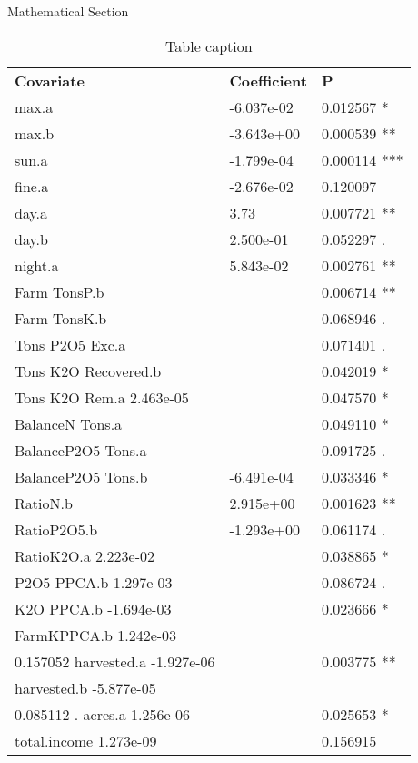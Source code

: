 \documentclass[final]{beamer}
\newlength{\onecolwid}
\newlength{\twocolwid}
\begin{document}
\begin{frame}[t]
\begin{columns}[t]
\begin{column}{\twocolwid}
\begin{columns}[t,totalwidth=\twocolwid]
\begin{column}{\onecolwid}
\begin{block}{Mathematical Section}
   \begin{table}
   \vspace{2ex}
   \begin{tabular}{l l l}
   \textbf{Covariate} & \textbf{Coefficient} & \textbf{P}\\
   max.a &  -6.037e-02    & 0.012567 *    \\
   max.b  & -3.643e+00   & 0.000539 **    \\
   sun.a  &  -1.799e-04  &     0.000114 *** \\
   fine.a   & -2.676e-02  & 0.120097    \\
   day.a  &  3.73 & 0.007721 ** \\
   day.b   & 2.500e-01  & 0.052297 . \\
   night.a   &  5.843e-02 & 0.002761 ** \\
   Farm TonsP.b &   &  0.006714 ** \\
   Farm TonsK.b    &   & 0.068946 . \\
   Tons P2O5 Exc.a  &   &  0.071401 .  \\
   Tons K2O Recovered.b &   &  0.042019 * \\
   Tons K2O Rem.a 2.463e-05 &   & 0.047570 * \\
   BalanceN Tons.a  &   & 0.049110 * \\
   BalanceP2O5 Tons.a  &   & 0.091725 . \\
   BalanceP2O5 Tons.b & -6.491e-04  & 0.033346 * \\
   RatioN.b &  2.915e+00  &  0.001623 **  \\
   RatioP2O5.b & -1.293e+00  & 0.061174 . \\
   RatioK2O.a 2.223e-02 &   & 0.038865 * \\
   P2O5 PPCA.b 1.297e-03  &   & 0.086724 . \\
   K2O PPCA.b -1.694e-03 &   & 0.023666 * \\
   FarmKPPCA.b 1.242e-03 &   &    \\ 0.157052
   harvested.a -1.927e-06 &   &  0.003775 ** \\ 
   harvested.b -5.877e-05 &   &    \\ 0.085112 .
   acres.a 1.256e-06 &   &  0.025653 *   \\
   total.income 1.273e-09 &   & 0.156915
   \end{tabular}
   \caption{Table caption}
   \end{table}

\end{block}


\end{column}
\end{columns}
\end{column}
\end{columns}
\end{frame}
\end{document}
